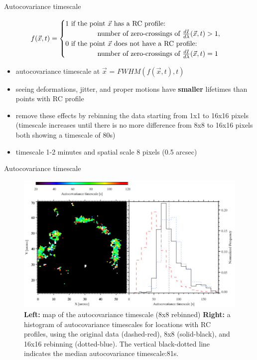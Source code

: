 \documentclass{beamer}
\begin{document}
\begin{frame}{Autocovariance timescale}


\begin{equation*}
f(\vec{x},t) = 
\begin{cases}
1 \text{ if the point } \vec{x} \text{ has a RC profile:} \\ \hspace{1.5cm} \text{ number of zero-crossings of } 
\frac{d I}{d \lambda}(\vec{x},t) > 1, \\
0 \text{ if the point } \vec{x} \text{ does not have a RC profile:} \\ \hspace{1.5cm} \text{ number of zero-crossings of } 
\frac{d I}{d \lambda}(\vec{x},t) = 1 
\end{cases}
\end{equation*}

\begin{itemize}
\item autocovariance timescale at $\vec{x}$ = $FWHM(f(\vec{x},t),t)$
\item seeing deformations, jitter, and proper motions have {\bf smaller } lifetimes than points with RC profile
\item remove these effects by rebinning the data starting from 1x1 to 16x16 pixels (timescale increases until there is no more difference
from 8x8 to 16x16 pixels both showing a timescale of 80s)
\item timescale 1-2 minutes and spatial scale 8 pixels (0.5 arcsec)
\end{itemize}

\end{frame}


\begin{frame}{Autocovariance timescale}
\vspace{-0.3cm}
\begin{figure}[H]
 \centering
 \includegraphics[scale=0.35]{im2.png}
	\caption{\small {\bf Left:} map of the autocovariance timescale (8x8 rebinned) 
	{\bf Right:}  a histogram of autocovariance timescales for locations with RC profiles, using the original data
(dashed-red), 8x8 (solid-black), and 16x16 rebinning (dotted-blue). 
The vertical black-dotted line indicates the median autocovariance timescale:81s.}
\end{figure}

\end{frame}
\end{document}
